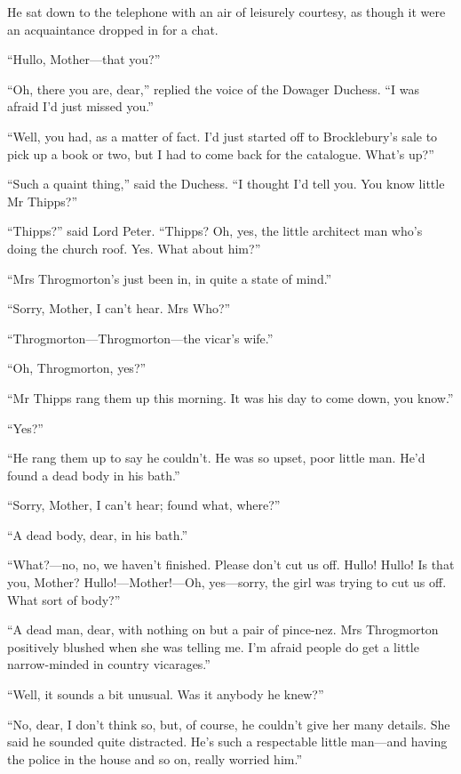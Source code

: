 He sat down to the telephone with an air of leisurely courtesy, as though it were an acquaintance dropped in for a chat.

\enquote{Hullo, Mother\allowbreak---\allowbreak that you?}

\enquote{Oh, there you are, dear,} replied the voice of the Dowager Duchess. \enquote{I was afraid I’d just missed you.}

\enquote{Well, you had, as a matter of fact. I’d just started off to Brocklebury’s sale to pick up a book or two, but I had to come back for the catalogue. What’s up?}

\enquote{Such a quaint thing,} said the Duchess. \enquote{I thought I’d tell you. You know little Mr Thipps?}

\enquote{Thipps?} said Lord Peter. \enquote{Thipps? Oh, yes, the little architect man who’s doing the church roof. Yes. What about him?}

\enquote{Mrs Throgmorton’s just been in, in quite a state of mind.}

\enquote{Sorry, Mother, I can’t hear. Mrs Who?}

\enquote{Throgmorton\allowbreak---\allowbreak Throgmorton---the vicar’s wife.}

\enquote{Oh, Throgmorton, yes?}

\enquote{Mr Thipps rang them up this morning. It was his day to come down, you know.}

\enquote{Yes?}

\enquote{He rang them up to say he couldn’t. He was so upset, poor little man. He’d found a dead body in his bath.}

\enquote{Sorry, Mother, I can’t hear; found what, where?}

\enquote{A dead body, dear, in his bath.}

\enquote{What?---no, no, we haven’t finished. Please don’t cut us off. Hullo! Hullo! Is that you, Mother? Hullo!---Mother!---Oh, yes\allowbreak---\allowbreak sorry, the girl was trying to cut us off. What sort of body?}

\enquote{A dead man, dear, with nothing on but a pair of pince-nez. Mrs Throgmorton positively blushed when she was telling me. I’m afraid people do get a little narrow-minded in country vicarages.}

\enquote{Well, it sounds a bit unusual. Was it anybody he knew?}

\enquote{No, dear, I don’t think so, but, of course, he couldn’t give her many details. She said he sounded quite distracted. He’s such a respectable little man\allowbreak---\allowbreak and having the police in the house and so on, really worried him.}

